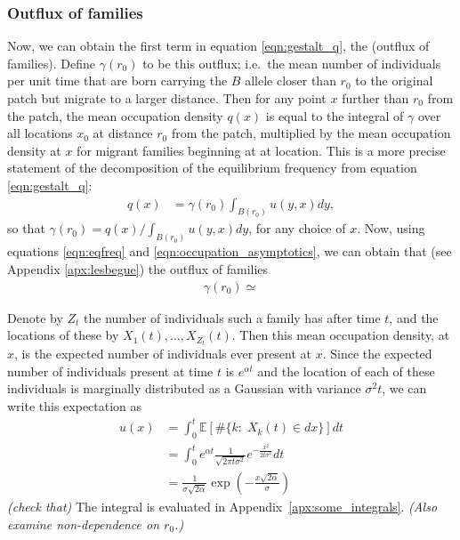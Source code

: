 \documentclass{article}
\newcommand{\E}{\mathbb{E}}
\newcommand{\plr}[1]{{\it\color{blue}(#1)}}
\begin{document}
\subsubsection*{Outflux of families}

Now, we can obtain the first term in equation \eqref{eqn:gestalt_q}, the (outflux of families).
Define $\gamma(r_0)$ to be this outflux; 
i.e.\ the mean number of individuals per unit time that are born carrying the $B$ allele closer than $r_0$ to the original patch
but migrate to a larger distance.
Then for any point $x$ further than $r_0$ from the patch, 
the mean occupation density $q(x)$ is equal to the integral of $\gamma$ over all locations $x_0$ at distance $r_0$ from the patch,
multiplied by the mean occupation density at $x$ for migrant families beginning at at location.
This is a more precise statement of the decomposition of the equilibrium frequency from equation \eqref{eqn:gestalt_q}:
\begin{align}
    q(x) &= \gamma(r_0) \int_{B(r_0)} u(y,x) dy,
\end{align}
so that $\gamma(r_0) = q(x) / \int_{B(r_0)} u(y,x) dy$, for any choice of $x$.
Now, using equations \eqref{eqn:eqfreq} and \eqref{eqn:occupation_asymptotics}, 
we can obtain that (see Appendix \ref{apx:lesbegue})
the outflux of families 
\begin{align}
    \gamma(r_0) \simeq 
\end{align}

Denote by $Z_t$ the number of individuals such a family has after time $t$,
and the locations of these by $X_1(t), \ldots, X_{Z_t}(t)$.
Then this mean occupation density, at $x$, is the expected number of individuals ever present at $x$. 
Since the expected number of individuals present at time $t$ is $e^{\alpha t}$
and the location of each of these individuals is marginally distributed as a  Gaussian with variance $\sigma^2 t$,
we can write this expectation as
\begin{align}
    u(x) &= \int_0^t \E[ \#\{ k : \; X_k(t) \in dx \} ] dt \\
    &= \int_0^t e^{\alpha t} \frac{1}{\sqrt{2 \pi t \sigma^2}} e^{-\frac{x^2}{2t\sigma^2}} dt \\
    &= \frac{ 1 }{ \sigma \sqrt{2 \alpha} } \exp\left( - \frac{ x \sqrt{2\alpha} }{ \sigma } \right) 
\end{align}
\plr{check that}
The integral is evaluated in Appendix~\ref{apx:some_integrals}.
\plr{Also examine non-dependence on $r_0$.}
\end{document}
